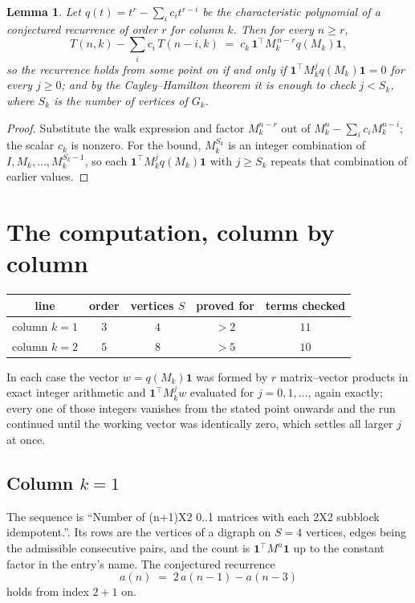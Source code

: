 \documentclass[11pt,a4paper]{article}
\theoremstyle{plain}
\newtheorem{lemma}[theorem]{Lemma}
\theoremstyle{definition}
\begin{document}
\begin{lemma}\label{lem:crit}
Let $q(t)=t^{r}-\sum_i c_it^{r-i}$ be the characteristic polynomial of a conjectured
recurrence of order $r$ for column $k$. Then for every $n\ge r$,
\[
T(n,k)-\sum_i c_i\,T(n-i,k)\;=\;c_k\,\mathbf{1}^{\!\top}M_k^{\,n-r}q(M_k)\mathbf{1},
\]
so the recurrence holds from some point on if and only if
$\mathbf{1}^{\!\top}M_k^{j}q(M_k)\mathbf{1}=0$ for every $j\ge0$; and by the
Cayley--Hamilton theorem it is enough to check $j<S_k$, where $S_k$ is the number of vertices
of $G_k$.
\end{lemma}

\begin{proof}
Substitute the walk expression and factor $M_k^{n-r}$ out of $M_k^{n}-\sum_ic_iM_k^{n-i}$;
the scalar $c_k$ is nonzero. For the bound, $M_k^{S_k}$ is an integer combination of
$I,M_k,\dots,M_k^{S_k-1}$, so each $\mathbf{1}^{\!\top}M_k^{j}q(M_k)\mathbf{1}$ with
$j\ge S_k$ repeats that combination of earlier values.
\end{proof}

\section{The computation, column by column}

\begin{center}
\begin{tabular}{ccccc}
line & order & vertices $S$ & proved for & terms checked \\ \hline
column $k$$=1$ & $3$ & $4$ & $>2$ & $11$ \\
column $k$$=2$ & $5$ & $8$ & $>5$ & $10$ \\
\end{tabular}
\end{center}

In each case the vector $w=q(M_k)\mathbf{1}$ was formed by $r$ matrix--vector products in
exact integer arithmetic and $\mathbf{1}^{\!\top}M_k^{j}w$ evaluated for $j=0,1,\dots$,
again exactly; every one of those integers vanishes from the stated point onwards and the run
continued until the working vector was identically zero, which settles all larger $j$ at once.

\subsection*{Column $k$$=1$}
The sequence is ``Number of (n+1)X2 0..1 matrices with each 2X2 subblock idempotent.''. Its rows are the vertices of a digraph on
$S=4$ vertices, edges being the admissible consecutive pairs, and the count is
$\mathbf{1}^{\!\top}M^{n}\mathbf{1}$ up to the constant factor in the entry's name.
The conjectured recurrence
\[
a(n)\;=\;2\,a(n-1) - a(n-3)
\]
holds from index $2+1$ on.
\end{document}
